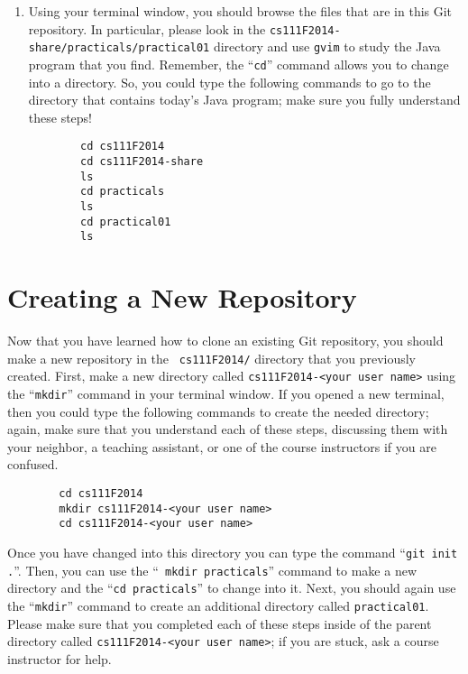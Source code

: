 \begin{enumerate}
  \item Using your terminal window, you should browse the files that are in this Git repository.  In particular, please
    look in the {\tt cs111F2014-share/practicals/practical01} directory and use {\tt gvim} to study the Java program that
    you find.  Remember, the ``{\tt cd}'' command allows you to change into a directory. So, you could type the following
    commands to go to the directory that contains today's Java program; make sure you fully understand these steps!

\vspace*{-.1in}
\begin{verbatim}
        cd cs111F2014
        cd cs111F2014-share
        ls
        cd practicals
        ls
        cd practical01
        ls
\end{verbatim}
\vspace*{-.2in}

\end{enumerate}

\section*{Creating a New Repository}

Now that you have learned how to clone an existing Git repository, you should make a new repository in the {\tt
cs111F2014/} directory that you previously created.  First, make a new directory called {\tt cs111F2014-<your user
name>} using the ``{\tt mkdir}'' command in your terminal window. If you opened a new terminal, then you could type the
following commands to create the needed directory; again, make sure that you understand each of these steps, discussing
them with your neighbor, a teaching assistant, or one of the course instructors if you are confused.

\vspace*{-.1in}
\begin{verbatim}
        cd cs111F2014
        mkdir cs111F2014-<your user name>
        cd cs111F2014-<your user name>
\end{verbatim}
\vspace*{-.1in}


Once you have changed into this directory you can type the command ``{\tt git init .}''. Then, you can use the ``{\tt
  mkdir practicals}'' command to make a new directory and the ``{\tt cd practicals}'' to change into it.  Next, you
should again use the ``{\tt mkdir}'' command to create an additional directory called {\tt practical01}.  Please make
sure that you completed each of these steps inside of the parent directory called {\tt cs111F2014-<your user name>}; if
you are stuck, ask a course instructor for help.

